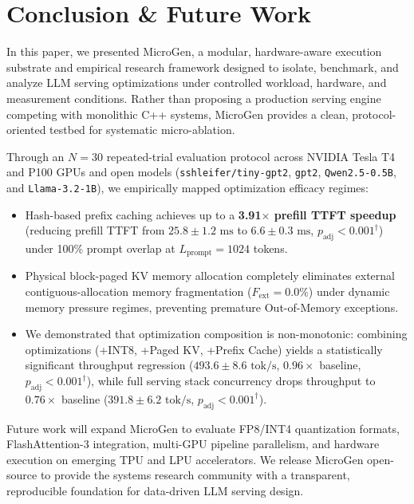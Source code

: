 \section{Conclusion \& Future Work}
\label{sec:conclusion}

In this paper, we presented \textsf{MicroGen}, a modular, hardware-aware execution substrate and empirical research framework designed to isolate, benchmark, and analyze LLM serving optimizations under controlled workload, hardware, and measurement conditions. Rather than proposing a production serving engine competing with monolithic C++ systems, \textsf{MicroGen} provides a clean, protocol-oriented testbed for systematic micro-ablation.

Through an $N=30$ repeated-trial evaluation protocol across NVIDIA Tesla T4 and P100 GPUs and open models (\texttt{sshleifer/tiny-gpt2}, \texttt{gpt2}, \texttt{Qwen2.5-0.5B}, and \texttt{Llama-3.2-1B}), we empirically mapped optimization efficacy regimes:
\begin{itemize}
    \item Hash-based prefix caching achieves up to a \textbf{3.91$\times$ prefill TTFT speedup} (reducing prefill TTFT from $25.8 \pm 1.2\text{ ms}$ to $6.6 \pm 0.3\text{ ms}$, $p_{\text{adj}} < 0.001^\dagger$) under 100\% prompt overlap at $L_{\text{prompt}}=1024$ tokens.
    \item Physical block-paged KV memory allocation completely eliminates external contiguous-allocation memory fragmentation ($F_{\text{ext}} = 0.0\%$) under dynamic memory pressure regimes, preventing premature Out-of-Memory exceptions.
    \item We demonstrated that optimization composition is non-monotonic: combining optimizations (+INT8, +Paged KV, +Prefix Cache) yields a statistically significant throughput regression ($493.6 \pm 8.6\text{ tok/s}$, $0.96\times$ baseline, $p_{\text{adj}} < 0.001^\dagger$), while full serving stack concurrency drops throughput to $0.76\times$ baseline ($391.8 \pm 6.2\text{ tok/s}$, $p_{\text{adj}} < 0.001^\dagger$).
\end{itemize}

Future work will expand \textsf{MicroGen} to evaluate FP8/INT4 quantization formats, FlashAttention-3 integration, multi-GPU pipeline parallelism, and hardware execution on emerging TPU and LPU accelerators. We release \textsf{MicroGen} open-source to provide the systems research community with a transparent, reproducible foundation for data-driven LLM serving design.
